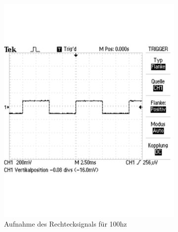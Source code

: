 \documentclass[12pt,a4paper]{article}
\begin{document}
\begin{figure}[H]
        \centering
        \begin{subfigure}[b]{0.48\textwidth}
                \includegraphics[width=\textwidth , scale = 0.4]{3_1_100hz.pdf}
				\caption[Aufnahme des Rechtecksignals für 100hz]{Aufnahme des Rechtecksignals für 100hz}
 	 			\label{fig:3_1_100hz}
        \end{subfigure}%
        ~ %
        \hfill
        \begin{subfigure}[b]{0.48\textwidth}

\end{subfigure}
\end{figure}
\end{document}
